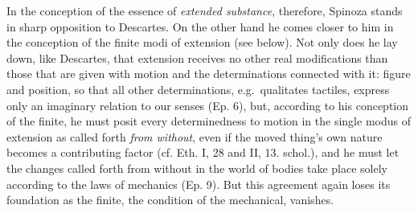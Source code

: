 \documentclass[12pt,a4paper,openany]{book}
\newcommand{\opage}[1]{\marginnote{\footnotesize\textit{[#1]}}}
\begin{document}
\opage{76}\setcounter{footnote}{0}In the conception of the essence of \emph{extended substance}, therefore,
Spinoza stands in sharp opposition to Descartes. On the other hand he comes
closer to him in the conception of the finite modi of extension (see
below). Not only does he lay down, like Descartes, that
extension receives no other real modifications than those
that are given with motion and the determinations connected with it:
figure and position, so that all other determinations, e.g.\
qualitates tactiles, express only an imaginary relation to our
senses (Ep. 6), but, according to his conception of the finite, he must
posit every determinedness to motion in the single
modus of extension as called forth \emph{from without}, even if the moved thing's
own nature becomes a contributing factor (cf. Eth. I, 28 and II,
13. schol.), and he must let the changes called forth from without in
the world of bodies take place solely according to the laws of mechanics (Ep. 9).
But this agreement again loses its foundation as the
finite, the condition of the mechanical, vanishes.
\end{document}
